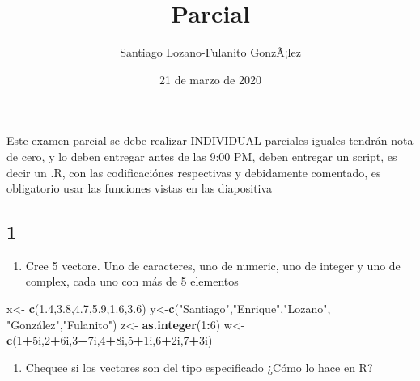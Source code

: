 \documentclass[]{article}
\title{Parcial}
\author{Santiago Lozano-Fulanito GonzÃ¡lez}
\date{21 de marzo de 2020}
\newenvironment{Shaded}{\begin{snugshade}}{\end{snugshade}}
\newcommand{\KeywordTok}[1]{\textcolor[rgb]{0.13,0.29,0.53}{\textbf{#1}}}
\newcommand{\DecValTok}[1]{\textcolor[rgb]{0.00,0.00,0.81}{#1}}
\newcommand{\FloatTok}[1]{\textcolor[rgb]{0.00,0.00,0.81}{#1}}
\newcommand{\StringTok}[1]{\textcolor[rgb]{0.31,0.60,0.02}{#1}}
\newcommand{\OperatorTok}[1]{\textcolor[rgb]{0.81,0.36,0.00}{\textbf{#1}}}
\newcommand{\NormalTok}[1]{#1}
\providecommand{\tightlist}{%
  \setlength{\itemsep}{0pt}\setlength{\parskip}{0pt}}
\begin{document}
\maketitle

Este examen parcial se debe realizar INDIVIDUAL parciales
iguales tendrán nota de cero, y lo deben entregar antes de las 9:00 PM,
deben entregar un script, es decir un .R, con las codificaciónes
respectivas y debidamente comentado, es obligatorio usar las funciones
vistas en las diapositiva

\subsection{1}\label{section}

\begin{enumerate}
\def\labelenumi{\alph{enumi}.}
\tightlist
\item
  Cree 5 vectore. Uno de caracteres, uno de numeric, uno de integer y
  uno de complex, cada uno con más de 5 elementos
\end{enumerate}

\begin{Shaded}
\begin{Highlighting}[]
\NormalTok{x<-}\StringTok{ }\KeywordTok{c}\NormalTok{(}\FloatTok{1.4}\NormalTok{,}\FloatTok{3.8}\NormalTok{,}\FloatTok{4.7}\NormalTok{,}\FloatTok{5.9}\NormalTok{,}\FloatTok{1.6}\NormalTok{,}\FloatTok{3.6}\NormalTok{)}
\NormalTok{y<-}\KeywordTok{c}\NormalTok{(}\StringTok{"Santiago"}\NormalTok{,}\StringTok{"Enrique"}\NormalTok{,}\StringTok{"Lozano"}\NormalTok{, }\StringTok{"González"}\NormalTok{,}\StringTok{"Fulanito"}\NormalTok{)}
\NormalTok{z<-}\StringTok{ }\KeywordTok{as.integer}\NormalTok{(}\DecValTok{1}\OperatorTok{:}\DecValTok{6}\NormalTok{)}
\NormalTok{w<-}\StringTok{ }\KeywordTok{c}\NormalTok{(}\DecValTok{1}\OperatorTok{+}\NormalTok{5i,}\DecValTok{2}\OperatorTok{+}\NormalTok{6i,}\DecValTok{3}\OperatorTok{+}\NormalTok{7i,}\DecValTok{4}\OperatorTok{+}\NormalTok{8i,}\DecValTok{5}\OperatorTok{+}\NormalTok{1i,}\DecValTok{6}\OperatorTok{+}\NormalTok{2i,}\DecValTok{7}\OperatorTok{+}\NormalTok{3i)}
\end{Highlighting}
\end{Shaded}

\begin{enumerate}
\def\labelenumi{\alph{enumi}.}
\setcounter{enumi}{1}
\tightlist
\item
  Chequee si los vectores son del tipo especificado ¿Cómo lo hace en R?
\end{enumerate}
\end{document}
